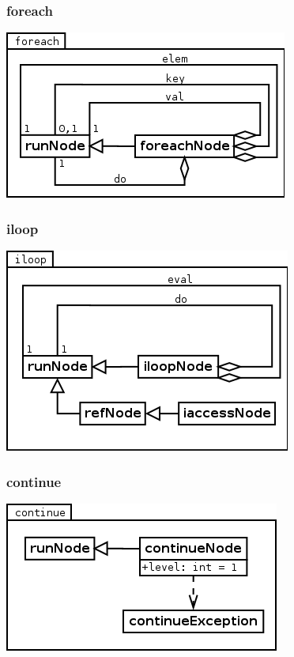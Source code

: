\subsubsection{foreach}
\begin{center}
\includegraphics[scale=0.4]{foreach.png} \\
\end{center}

\subsubsection{iloop}
\begin{center}
\includegraphics[scale=0.4]{iloop.png} \\
\end{center}


\subsubsection{continue}
\begin{center}
\includegraphics[scale=0.4]{continue.png} \\
\end{center}


